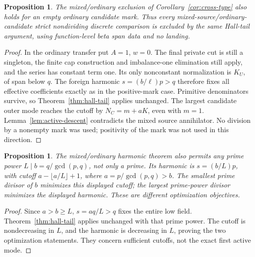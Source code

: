 \documentclass[11pt,a4paper]{amsart}
\numberwithin{equation}{section}
\theoremstyle{plain}
\newtheorem{proposition}[theorem]{Proposition}
\theoremstyle{definition}
\begin{document}
\begin{proposition}\label{prop:empty-mo}
The mixed/ordinary exclusion of Corollary~\ref{cor:cross-type} also holds for an empty ordinary candidate mark.  Thus every mixed-source/ordinary-candidate strict nondividing discrete comparison is excluded by the same Hall-tail argument, using function-level beta span data and no landing.
\end{proposition}
\begin{proof}
In the ordinary transfer put \(A=1\), \(w=0\).  The final private cut is still a singleton, the finite cap construction and imbalance-one elimination still apply, and the series has constant term one.  Its only nonconstant normalization is \(K_U\), of span below \(q\).  The foreign harmonic \(s=(b/\ell)p>q\) therefore fixes all effective coefficients exactly as in the positive-mark case.  Primitive denominators survive, so Theorem~\ref{thm:hall-tail} applies unchanged.  The largest candidate outer mode reaches the cutoff by \(N_C=m+aK\), even with \(m=1\).  Lemma~\ref{lem:active-descent} contradicts the mixed source annihilator.  No division by a nonempty mark was used; positivity of the mark was not used in this direction.
\end{proof}

\begin{proposition}\label{prop:prime-power-mo}
The mixed/ordinary harmonic theorem also permits any prime power \(L\mid b=q/\gcd(p,q)\), not only a prime.  Its harmonic is \(s=(b/L)p\), with cutoff \(a-\lfloor a/L\rfloor+1\), where \(a=p/\gcd(p,q)>b\).  The smallest prime divisor of \(b\) minimizes this displayed cutoff; the largest prime-power divisor minimizes the displayed harmonic.  These are different optimization objectives.
\end{proposition}
\begin{proof}
Since \(a>b\ge L\), \(s=aq/L>q\) fixes the entire low field.  Theorem~\ref{thm:hall-tail} applies unchanged with that prime power.  The cutoff is nondecreasing in \(L\), and the harmonic is decreasing in \(L\), proving the two optimization statements.  They concern sufficient cutoffs, not the exact first active mode.
\end{proof}
\end{document}
